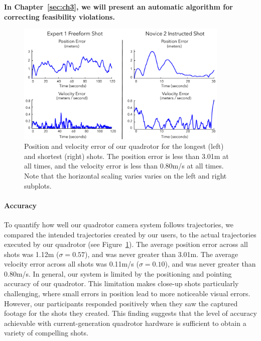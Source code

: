 \begin{tcolorbox}[before skip=20pt, after skip=20pt, sharp corners]
\begin{center}
\textbf{In Chapter~\ref{sec:ch3}, we will present an automatic algorithm for correcting feasibility violations.}
\end{center}
\end{tcolorbox}

\begin{figure}[t]
\centering
\includegraphics[width=4.0in]{images/2015_siggraph_asia/errors.pdf}
\caption{
Position and velocity error of our quadrotor for the longest (left) and shortest (right) shots.
The position error is less than 3.01m at all times, and the velocity error is less than 0.80m/s at all times.
Note that the horizontal scaling varies varies on the left and right subplots. 
}
\label{fig:ch2:errors}
\end{figure}

\paragraph{Accuracy}
To quantify how well our quadrotor camera system follows trajectories, we compared the intended trajectories created by our users, to the actual trajectories executed by our quadrotor (see Figure~\ref{fig:ch2:errors}).
The average position error across all shots was 1.12m ($\sigma = 0.57$), and was never greater than 3.01m.
The average velocity error across all shots was 0.11m/s ($\sigma = 0.10$), and was never greater than 0.80m/s.
In general, our system is limited by the positioning and pointing accuracy of our quadrotor.
This limitation makes close-up shots particularly challenging, where small errors in position lead to more noticeable visual errors.
However, our participants responded positively when they saw the captured footage for the shots they created.
This finding suggests that the level of accuracy achievable with current-generation quadrotor hardware is sufficient to obtain a variety of compelling shots.

